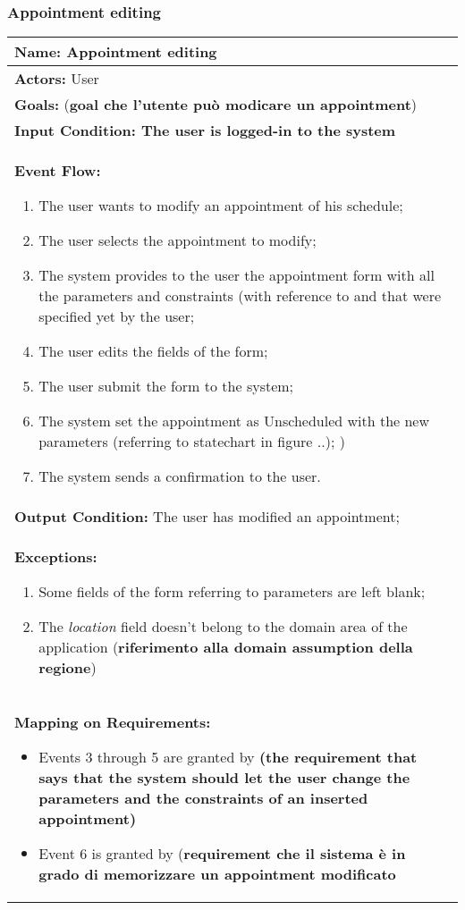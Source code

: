 \subsubsection{Appointment editing}\label{usecase:appediting}
\begin{longtable}{|p{14cm}|} \hline
\textbf{Name:} Appointment editing \\ \hline
\textbf{Actors:} User \\ \hline
\textbf{Goals:} (\textbf{goal che l'utente può modicare un appointment})\\ \hline
\textbf{Input Condition: The user is logged-in to the system} \\ \hline
\textbf{Event Flow:}
\begin{enumerate}
\item The user wants to modify an appointment of his schedule;
\item The user selects the appointment to modify;
\item The system provides to the user the appointment form with all the parameters and constraints (with reference to %
and 
that were specified yet by the user; 
\item The user edits the fields of the form;
\item The user submit the form to the system;
\item The system set the appointment as Unscheduled with the new parameters (referring to statechart in figure ..); \label{fig:stchartApp})
\item The system sends a confirmation to the user.
\end{enumerate}	\\ \hline
\textbf{Output Condition:}  The user has modified an appointment; \\ \hline
\textbf{Exceptions:}
\begin{enumerate}
\item Some fields of the form referring to parameters are left blank;
\item The \textit{location} field doesn't belong to the domain area of the application (\textbf{riferimento alla domain assumption della regione})
\end{enumerate} \\ \hline
\textbf{Mapping on Requirements:}
\begin{itemize}
\item Events 3 through 5 are granted by \textbf{(the requirement that says that the system should let the user change the parameters and the constraints of an inserted appointment)}
\item Event 6 is granted by (\textbf{requirement che il sistema è in grado di memorizzare un appointment modificato}
\end{itemize}  \\ \hline

\end{longtable}

